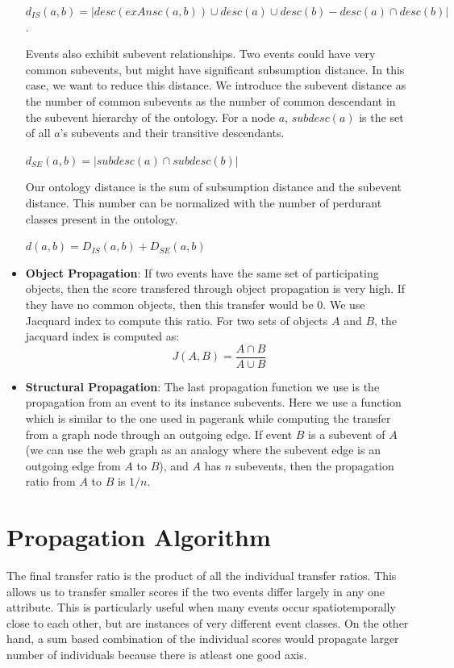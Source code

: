 \begin{itemize}
$d_{IS}(a, b) = |desc(exAnsc(a, b)) \cup desc(a) \cup desc(b) - desc(a) \cap desc(b)|$.

Events also exhibit subevent relationships. Two events could have very common subevents, but might have significant subsumption distance. In this case, we want to reduce this distance. We introduce the subevent distance as the number of common subevents as the number of common descendant in the subevent hierarchy of the ontology. For a node $a$, $subdesc(a)$ is the set of all $a$'s subevents and their transitive descendants.

$d_{SE}(a, b) = |subdesc(a) \cap subdesc(b)|$

Our ontology distance is the sum of subsumption distance and the subevent distance. This number can be normalized with the number of perdurant classes present in the ontology.

$d(a, b) = D_{IS}(a, b) + D_{SE}(a, b)$

\item \textbf{Object Propagation}: If two events have the same set of participating objects, then the score transfered through object propagation is very high. If they have no common objects, then this transfer would be 0. We use Jacquard index to compute this ratio. For two sets of objects $A$ and $B$, the jacquard index is computed as:
\begin{equation}
J(A, B) = \frac{A \cap B}{A \cup B} \nonumber
\end{equation}

\item \textbf{Structural Propagation}: The last propagation function we use is the propagation from an event to its instance subevents. Here we use a function which is similar to the one used in pagerank while computing the transfer from a graph node through an outgoing edge. If event $B$ is a subevent of $A$ (we can use the web graph as an analogy where the subevent edge is an outgoing edge from $A$ to $B$), and $A$ has $n$ subevents, then the propagation ratio from $A$ to $B$ is $1/n$.

\end{itemize}

\section {Propagation Algorithm}

The final transfer ratio is the product of all the individual transfer ratios. This allows us to transfer smaller scores if the two events differ largely in any one attribute. This is particularly useful when many events occur spatiotemporally close to each other, but are instances of very different event classes. On the other hand, a sum based combination of the individual scores would propagate larger number of individuals because there is atleast one good axis.

